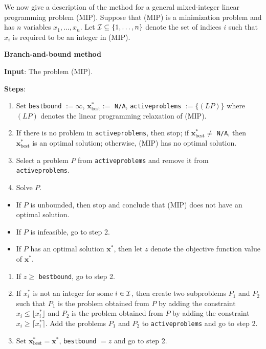 \documentclass[]{book}
\renewcommand{\vec}[1]{\mathbf{#1}}
\theoremstyle{definition}
\theoremstyle{definition}
\theoremstyle{remark}
\begin{document}
We now give a description of the method for a general mixed-integer
linear programming problem (MIP). Suppose that (MIP) is a minimization
problem and has \(n\) variables \(x_1,\ldots,x_n\). Let
\({\cal I} \subseteq \{1,\ldots,n\}\) denote the set of indices \(i\)
such that \(x_i\) is required to be an integer in (MIP).

\textbf{Branch-and-bound method}

\textbf{Input}: The problem (MIP).

\textbf{Steps}:

\begin{enumerate}
\def\labelenumi{\arabic{enumi}.}
\item
  Set \texttt{bestbound} \(:= \infty\), \(\vec{x}^*_{\text{best}}:= \)
  \texttt{N/A}, \texttt{activeproblems} \(:= \{ (LP) \}\) where \((LP)\)
  denotes the linear programming relaxation of (MIP).
\item
  If there is no problem in \texttt{activeproblems}, then stop; if
  \(\vec{x}^*_{\text{best}} \neq \) \texttt{N/A}, then
  \(\vec{x}^*_{\text{best}}\) is an optimal solution; otherwise, (MIP)
  has no optimal solution.
\item
  Select a problem \(P\) from \texttt{activeproblems} and remove it from
  \texttt{activeproblems}.
\item
  Solve \(P\).
\end{enumerate}

\begin{itemize}
\item
  If \(P\) is unbounded, then stop and conclude that (MIP) does not have
  an optimal solution.
\item
  If \(P\) is infeasible, go to step 2.
\item
  If \(P\) has an optimal solution \(\vec{x}^*\), then let \(z\) denote
  the objective function value of \(\vec{x}^*\).
\end{itemize}

\begin{enumerate}
\def\labelenumi{\arabic{enumi}.}
\setcounter{enumi}{4}
\item
  If \(z \geq \) \texttt{bestbound}, go to step 2.
\item
  If \(x^*_i\) is not an integer for some \(i \in {\cal I}\), then
  create two subproblems \(P_1\) and \(P_2\) such that \(P_1\) is the
  problem obtained from \(P\) by adding the constraint
  \(x_i \leq \lfloor x^*_i \rfloor\) and \(P_2\) is the problem obtained
  from \(P\) by adding the constraint \(x_i \geq \lceil x^*_i \rceil\).
  Add the problems \(P_1\) and \(P_2\) to \texttt{activeproblems} and go
  to step 2.
\item
  Set \(\vec{x}^*_{\text{best}} = \vec{x}^*\), \texttt{bestbound} \(=z\)
  and go to step 2.
\end{enumerate}
\end{document}

